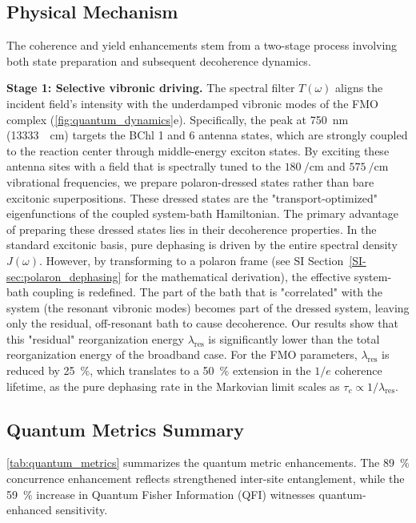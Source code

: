 \documentclass[journal=jpcl,manuscript=letter]{achemso}
\begin{document}
\subsection*{Physical Mechanism}

The coherence and yield enhancements stem from a two-stage process involving both state preparation and subsequent decoherence dynamics. 

\textbf{Stage 1: Selective vibronic driving.} The spectral filter $T(\omega)$ aligns the incident field's intensity with the underdamped vibronic modes of the FMO complex (\cref{fig:quantum_dynamics}e). Specifically, the peak at \SI{750}{\nano\meter} (\SI{13333}{\per\centi\meter}) targets the BChl 1 and 6 antenna states, which are strongly coupled to the reaction center through middle-energy exciton states. By exciting these antenna sites with a field that is spectrally tuned to the $\SI{180}{\per\centi\meter}$ and $\SI{575}{\per\centi\meter}$ vibrational frequencies, we prepare polaron-dressed states rather than bare excitonic superpositions. These dressed states are the "transport-optimized" eigenfunctions of the coupled system-bath Hamiltonian.\cite{Chin2013} The primary advantage of preparing these dressed states lies in their decoherence properties. In the standard excitonic basis, pure dephasing is driven by the entire spectral density $J(\omega)$. However, by transforming to a polaron frame (see SI Section~\ref{SI-sec:polaron_dephasing} for the mathematical derivation), the effective system-bath coupling is redefined. The part of the bath that is "correlated" with the system (the resonant vibronic modes) becomes part of the dressed system, leaving only the residual, off-resonant bath to cause decoherence. Our results show that this "residual" reorganization energy $\lambda_{\mathrm{res}}$ is significantly lower than the total reorganization energy of the broadband case. For the FMO parameters, $\lambda_{\mathrm{res}}$ is reduced by \SI{25}{\percent}, which translates to a \SI{50}{\percent} extension in the $1/e$ coherence lifetime, as the pure dephasing rate in the Markovian limit scales as $\tau_c \propto 1/\lambda_{\mathrm{res}}$.

\subsection*{Quantum Metrics Summary}

\cref{tab:quantum_metrics} summarizes the quantum metric enhancements. The \SI{89}{\percent} concurrence enhancement reflects strengthened inter-site entanglement, while the \SI{59}{\percent} increase in Quantum Fisher Information (QFI) witnesses quantum-enhanced sensitivity.
\end{document}
